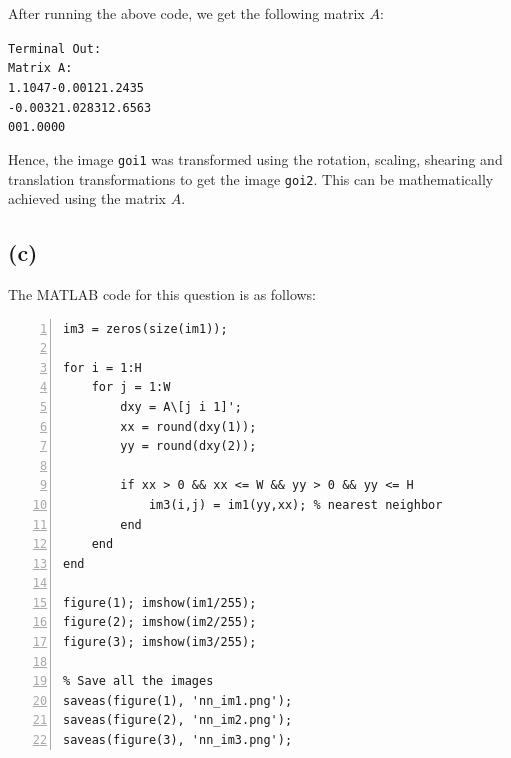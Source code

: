\documentclass{article}
\begin{document}
After running the above code, we get the following matrix $A$:

\texttt{Terminal Out:\\
Matrix A:\\
\hspace*{2em}1.1047\hspace*{1.5em}-0.0012\hspace*{2.5em}1.2435\\
\hspace*{1.5em}-0.0032\hspace*{2em}1.0283\hspace*{2em}12.6563\\
\hspace*{2em}\hspace*{2.5em}0\hspace*{2em}\hspace*{2.5em}0\hspace*{2em}\hspace*{0.5em}1.0000}

Hence, the image \texttt{goi1} was transformed using the rotation, scaling, shearing and translation transformations to get the image \texttt{goi2}. This can be mathematically achieved using the matrix $A$.

\subsection*{(c)}

The MATLAB code for this question is as follows:
\begin{lstlisting}[frame=single,numbers=left,style=Matlab-Pyglike,breaklines=true,postbreak=\mbox{\textcolor{red}{$\hookrightarrow$}\space}]
im3 = zeros(size(im1));

for i = 1:H 
    for j = 1:W 
        dxy = A\[j i 1]'; 
        xx = round(dxy(1)); 
        yy = round(dxy(2)); 
        
        if xx > 0 && xx <= W && yy > 0 && yy <= H 
            im3(i,j) = im1(yy,xx); % nearest neighbor
        end
    end
end

figure(1); imshow(im1/255);
figure(2); imshow(im2/255);
figure(3); imshow(im3/255);

% Save all the images
saveas(figure(1), 'nn_im1.png');
saveas(figure(2), 'nn_im2.png');
saveas(figure(3), 'nn_im3.png');
\end{lstlisting}
\end{document}
